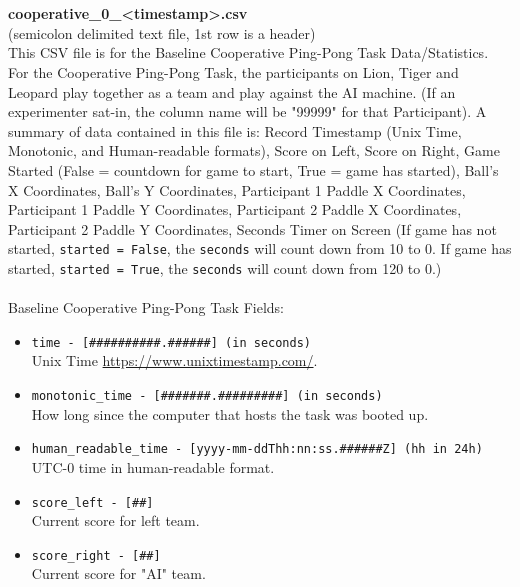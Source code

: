 \begin{description}
\begin{addmargin}[0em]{0em}
        \textbf{\\\\}
        \begin{addmargin}[1em]{0em} %
            \textbf{cooperative\_0\_<timestamp>.csv}\\(semicolon delimited text file, 1st row is a header)\\
            This CSV file is for the Baseline Cooperative Ping-Pong Task Data/Statistics.
            For the Cooperative Ping-Pong Task, the participants on Lion, Tiger and Leopard play together as a team and play against the AI machine.
            (If an experimenter sat-in, the column name will be "99999" for that Participant).
            A summary of data contained in this file is: Record Timestamp (Unix Time, Monotonic, and Human-readable formats),
            Score on Left, Score on Right, Game Started (False = countdown for game to start, True = game has started),
            Ball's X Coordinates, Ball's Y Coordinates, Participant 1 Paddle X Coordinates, Participant 1 Paddle Y Coordinates,
            Participant 2 Paddle X Coordinates, Participant 2 Paddle Y Coordinates, Seconds Timer on Screen (If game has not started, \verb|started = False|,
            the \verb|seconds| will count down from 10 to 0. If game has started, \verb|started = True|, the \verb|seconds| will count down from 120 to 0.)\\\\
            Baseline Cooperative Ping-Pong Task Fields:
            \begin{itemize}
                \item \verb|time - [##########.######] (in seconds)|\\Unix Time \href{https://www.unixtimestamp.com/}{https://www.unixtimestamp.com/}.
                \item \verb|monotonic_time - [#######.#########] (in seconds)|\\How long since the computer that hosts the task was booted up.
                \item \verb|human_readable_time - [yyyy-mm-ddThh:nn:ss.######Z] (hh in 24h)|\\UTC-0 time in human-readable format.
                \item \verb|score_left - [##]|\\Current score for left team.
                \item \verb|score_right - [##]|\\Current score for "AI" team.

\end{itemize}
\end{addmargin}
\end{addmargin}
\end{description}
